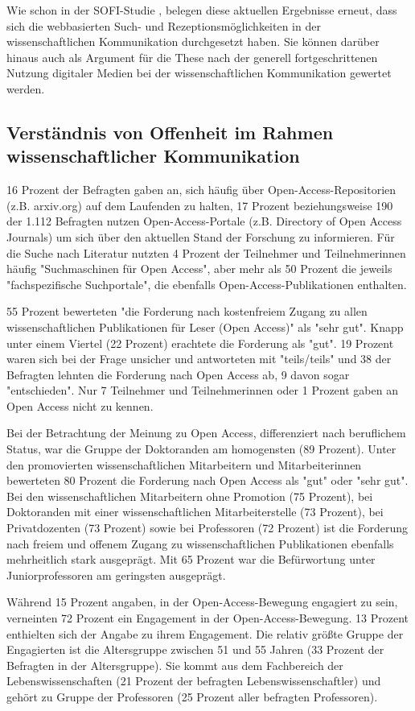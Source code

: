 Wie schon in der SOFI-Studie \cite{Hanekop_2014}, belegen diese aktuellen Ergebnisse erneut, dass sich die webbasierten Such- und Rezeptionsmöglichkeiten in der wissenschaftlichen Kommunikation durchgesetzt haben. Sie können darüber hinaus auch als Argument für die These nach der generell fortgeschrittenen Nutzung digitaler Medien bei der wissenschaftlichen Kommunikation gewertet werden.

\subsection{Verständnis von Offenheit im Rahmen wissenschaftlicher Kommunikation}

16 Prozent der Befragten gaben an, sich häufig über Open-Access-Repositorien (z.B. arxiv.org) auf dem Laufenden zu halten, 17 Prozent beziehungsweise 190 der 1.112 Befragten nutzen Open-Access-Portale (z.B. Directory of Open Access Journals) um sich über den aktuellen Stand der Forschung zu informieren. Für die Suche nach Literatur nutzten 4 Prozent der Teilnehmer und Teilnehmerinnen häufig "Suchmaschinen für Open Access", aber mehr als 50 Prozent die jeweils "fachspezifische Suchportale", die ebenfalls Open-Access-Publikationen enthalten.

55 Prozent bewerteten "die Forderung nach kostenfreiem Zugang zu allen wissenschaftlichen Publikationen für Leser (Open Access)" als "sehr gut". Knapp unter einem Viertel (22 Prozent) erachtete die Forderung als "gut". 19 Prozent waren sich bei der Frage unsicher und antworteten mit "teils/teils" und 38 der Befragten lehnten die Forderung nach Open Access ab, 9 davon sogar "entschieden". Nur 7 Teilnehmer und Teilnehmerinnen oder 1 Prozent gaben an Open Access nicht zu kennen.

Bei der Betrachtung der Meinung zu Open Access, differenziert nach beruflichem Status, war die Gruppe der Doktoranden am homogensten (89 Prozent). Unter den promovierten wissenschaftlichen Mitarbeitern und Mitarbeiterinnen bewerteten 80 Prozent die Forderung nach Open Access als "gut" oder "sehr gut". Bei den wissenschaftlichen Mitarbeitern ohne Promotion (75 Prozent), bei Doktoranden mit einer wissenschaftlichen Mitarbeiterstelle (73 Prozent), bei Privatdozenten (73 Prozent) sowie bei Professoren (72 Prozent) ist die Forderung nach freiem und offenem Zugang zu wissenschaftlichen Publikationen ebenfalls mehrheitlich stark ausgeprägt. Mit 65 Prozent war die Befürwortung unter Juniorprofessoren am geringsten ausgeprägt.

Während 15 Prozent angaben, in der Open-Access-Bewegung engagiert zu sein, verneinten 72 Prozent ein Engagement in der Open-Access-Bewegung. 13 Prozent enthielten sich der Angabe zu ihrem Engagement. Die relativ größte Gruppe der Engagierten ist die Altersgruppe zwischen 51 und 55 Jahren (33 Prozent der Befragten in der Altersgruppe). Sie kommt aus dem Fachbereich der Lebenswissenschaften (21 Prozent der befragten Lebenswissenschaftler) und gehört zu Gruppe der Professoren (25 Prozent aller befragten Professoren).

